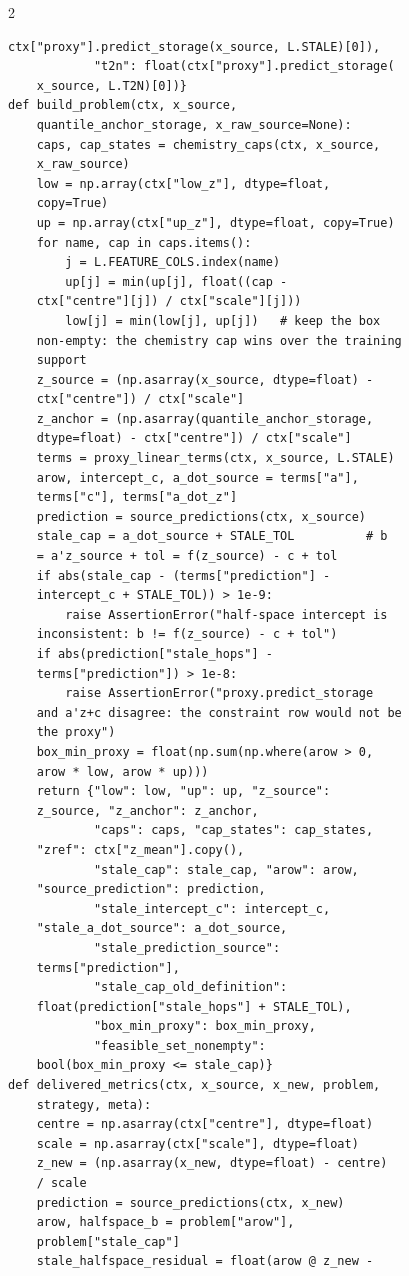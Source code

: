 \begin{multicols}{2}
\begin{Verbatim}[fontsize=\scriptsize]
    ctx["proxy"].predict_storage(x_source, L.STALE)[0]),
            "t2n": float(ctx["proxy"].predict_storage(
    x_source, L.T2N)[0])}
def build_problem(ctx, x_source,
    quantile_anchor_storage, x_raw_source=None):
    caps, cap_states = chemistry_caps(ctx, x_source,
    x_raw_source)
    low = np.array(ctx["low_z"], dtype=float,
    copy=True)
    up = np.array(ctx["up_z"], dtype=float, copy=True)
    for name, cap in caps.items():
        j = L.FEATURE_COLS.index(name)
        up[j] = min(up[j], float((cap -
    ctx["centre"][j]) / ctx["scale"][j]))
        low[j] = min(low[j], up[j])   # keep the box
    non-empty: the chemistry cap wins over the training
    support
    z_source = (np.asarray(x_source, dtype=float) -
    ctx["centre"]) / ctx["scale"]
    z_anchor = (np.asarray(quantile_anchor_storage,
    dtype=float) - ctx["centre"]) / ctx["scale"]
    terms = proxy_linear_terms(ctx, x_source, L.STALE)
    arow, intercept_c, a_dot_source = terms["a"],
    terms["c"], terms["a_dot_z"]
    prediction = source_predictions(ctx, x_source)
    stale_cap = a_dot_source + STALE_TOL          # b
    = a'z_source + tol = f(z_source) - c + tol
    if abs(stale_cap - (terms["prediction"] -
    intercept_c + STALE_TOL)) > 1e-9:
        raise AssertionError("half-space intercept is
    inconsistent: b != f(z_source) - c + tol")
    if abs(prediction["stale_hops"] -
    terms["prediction"]) > 1e-8:
        raise AssertionError("proxy.predict_storage
    and a'z+c disagree: the constraint row would not be
    the proxy")
    box_min_proxy = float(np.sum(np.where(arow > 0,
    arow * low, arow * up)))
    return {"low": low, "up": up, "z_source":
    z_source, "z_anchor": z_anchor,
            "caps": caps, "cap_states": cap_states,
    "zref": ctx["z_mean"].copy(),
            "stale_cap": stale_cap, "arow": arow,
    "source_prediction": prediction,
            "stale_intercept_c": intercept_c,
    "stale_a_dot_source": a_dot_source,
            "stale_prediction_source":
    terms["prediction"],
            "stale_cap_old_definition":
    float(prediction["stale_hops"] + STALE_TOL),
            "box_min_proxy": box_min_proxy,
            "feasible_set_nonempty":
    bool(box_min_proxy <= stale_cap)}
def delivered_metrics(ctx, x_source, x_new, problem,
    strategy, meta):
    centre = np.asarray(ctx["centre"], dtype=float)
    scale = np.asarray(ctx["scale"], dtype=float)
    z_new = (np.asarray(x_new, dtype=float) - centre)
    / scale
    prediction = source_predictions(ctx, x_new)
    arow, halfspace_b = problem["arow"],
    problem["stale_cap"]
    stale_halfspace_residual = float(arow @ z_new -

\end{Verbatim}
\end{multicols}
